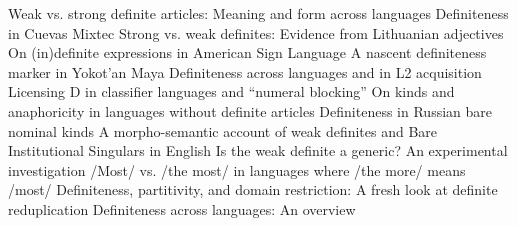 Weak vs. strong definite articles: Meaning and form across languages 
Definiteness in Cuevas Mixtec 
Strong vs. weak definites: Evidence from Lithuanian adjectives 
On (in)definite expressions in American Sign Language 
A nascent definiteness marker in Yokot'an Maya 
Definiteness across languages and in L2 acquisition 
Licensing D in classifier languages and ``numeral blocking'' 
On kinds and anaphoricity in languages without definite articles 
Definiteness in Russian bare nominal kinds 
A morpho-semantic account of weak definites and Bare Institutional Singulars in English 
Is the weak definite a generic? An experimental investigation 
/Most/ vs. /the most/ in languages where /the more/ means /most/ 
Definiteness, partitivity, and domain restriction: A fresh look at definite reduplication 
Definiteness across languages: An overview